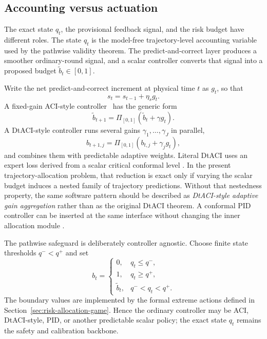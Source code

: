 \documentclass[11pt]{article}
\begin{document}
\subsection{Accounting versus actuation}
\label{sec:accounting-actuation}

The exact state $q_t$, the provisional feedback signal, and the risk budget have
different roles.  The state $q_t$ is the model-free trajectory-level accounting
variable used by the pathwise validity theorem.  The predict-and-correct layer
produces a smoother ordinary-round signal, and a scalar controller converts
that signal into a proposed budget $\widetilde b_t\in[0,1]$.

Write the net predict-and-correct increment at physical time $t$ as $g_t$, so
that
\[
    s_t=s_{t-1}+\eta_s g_t.
\]
A fixed-gain ACI-style controller~\cite{gibbs2021aci} has the generic form
\begin{equation}
    \widetilde b_{t+1}
    =
    \Pi_{[0,1]}
    \left(
        \widetilde b_t+\gamma g_t
    \right).
    \label{eq:aci-style-budget-update}
\end{equation}
A DtACI-style controller runs several gains $\gamma_1,\ldots,\gamma_J$ in
parallel,
\[
    b_{t+1,j}
    =
    \Pi_{[0,1]}(b_{t,j}+\gamma_j g_t),
\]
and combines them with predictable adaptive weights.  Literal DtACI uses an
expert loss derived from a scalar critical conformal level
\cite{gibbs2024dtaci}.  In the present trajectory-allocation problem, that
reduction is exact only if varying the scalar budget induces a nested family of
trajectory predictions.  Without that nestedness property, the same software
pattern should be described as \emph{DtACI-style adaptive gain aggregation}
rather than as the original DtACI theorem.  A conformal PID controller can be
inserted at the same interface without changing the inner allocation module
\cite{angelopoulos2023pid}.

The pathwise safeguard is deliberately controller agnostic.  Choose finite
state thresholds $q^-<q^+$ and set
\begin{equation}
\boxed{
    b_t
    =
    \begin{cases}
        0, & q_t\le q^-,\\[1mm]
        1, & q_t\ge q^+,\\[1mm]
        \widetilde b_t, & q^-<q_t<q^+.
    \end{cases}
}
\label{eq:safeguarded-budget}
\end{equation}
The boundary values are implemented by the formal extreme actions defined in
Section~\ref{sec:risk-allocation-game}.  Hence the ordinary controller may be
ACI, DtACI-style, PID, or another predictable scalar policy; the exact state
$q_t$ remains the safety and calibration backbone.
\end{document}
